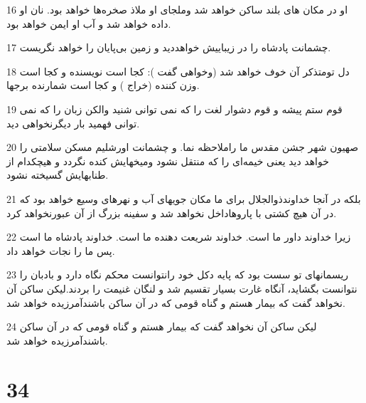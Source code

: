 \par 16 او در مکان های بلند ساکن خواهد شد وملجای او ملاذ صخره‌ها خواهد بود. نان او داده خواهد شد و آب او ایمن خواهد بود.
\par 17 چشمانت پادشاه را در زیباییش خواهددید و زمین بی‌پایان را خواهد نگریست.
\par 18 دل تومتذکر آن خوف خواهد شد (وخواهی گفت ): کجا است نویسنده و کجا است وزن کننده (خراج ) و کجا است شمارنده برجها.
\par 19 قوم ستم پیشه و قوم دشوار لغت را که نمی توانی شنید والکن زبان را که نمی توانی فهمید بار دیگرنخواهی دید.
\par 20 صهیون شهر جشن مقدس ما راملاحظه نما. و چشمانت اورشلیم مسکن سلامتی را خواهد دید یعنی خیمه‌ای را که منتقل نشود ومیخهایش کنده نگردد و هیچکدام از طنابهایش گسیخته نشود.
\par 21 بلکه در آنجا خداوندذوالجلال برای ما مکان جویهای آب و نهرهای وسیع خواهد بود که در آن هیچ کشتی با پاروهاداخل نخواهد شد و سفینه بزرگ از آن عبورنخواهد کرد.
\par 22 زیرا خداوند داور ما است. خداوند شریعت دهنده ما است. خداوند پادشاه ما است پس ما را نجات خواهد داد.
\par 23 ریسمانهای تو سست بود که پایه دکل خود رانتوانست محکم نگاه دارد و بادبان را نتوانست بگشاید، آنگاه غارت بسیار تقسیم شد و لنگان غنیمت را بردند.لیکن ساکن آن نخواهد گفت که بیمار هستم و گناه قومی که در آن ساکن باشندآمرزیده خواهد شد.
\par 24 لیکن ساکن آن نخواهد گفت که بیمار هستم و گناه قومی که در آن ساکن باشندآمرزیده خواهد شد.
 
\chapter{34}

